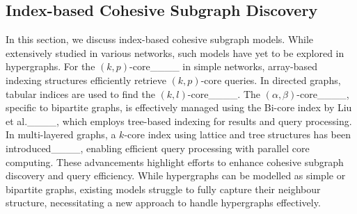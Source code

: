 

\subsection{Index-based Cohesive Subgraph Discovery} 
In this section, we discuss index-based cohesive subgraph models. While extensively studied in various networks, such models have yet to be explored in hypergraphs. For the $(k, p)$-core____ in simple networks, array-based indexing structures efficiently retrieve $(k, p)$-core queries. In directed graphs, tabular indices are used to find the $(k, l)$-core____. The $(\alpha, \beta)$-core____, specific to bipartite graphs, is effectively managed using the Bi-core index by Liu et al.____, which employs tree-based indexing for results and query processing. In multi-layered graphs, a $k$-core index using lattice and tree structures has been introduced____, enabling efficient query processing with parallel core computing. These advancements highlight efforts to enhance cohesive subgraph discovery and query efficiency. 
While hypergraphs can be modelled as simple or bipartite graphs, existing models struggle to fully capture their neighbour structure, necessitating a new approach to handle hypergraphs effectively.





